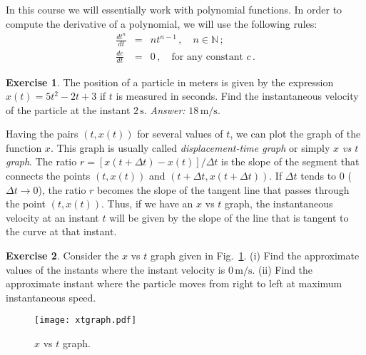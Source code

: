 \documentclass[12pt,a4paper]{article}
\newcommand{\N}{\mathbb{N}}
\theoremstyle{definition}
\newtheorem{ex}{Exercise}[section]
\begin{document}
In this course we will essentially work with polynomial functions. In
order to compute the derivative of a polynomial, we will use the
following rules:
\begin{eqnarray*}
  \frac{dt^n}{dt}&=&nt^{n-1}\,,\quad n\in\N\,;\\
  \frac{dc}{dt}&=& 0\,,\quad\mbox{for any constant }c\,.
\end{eqnarray*}

\begin{ex}
  The position of a particle in meters is given by the expression
  $x(t)=5 t^2-2 t+3$ if $t$ is measured in seconds. Find the
  instantaneous velocity of the particle at the instant
  $2\,\mathrm{s}$. \emph{Answer:} $18\,\mathrm{m/s}$.
\end{ex}

Having the pairs $(t,x(t))$ for several values of $t$, we can plot the
graph of the function $x$. This graph is usually called
\emph{displacement-time graph} or simply \emph{$x$ vs $t$ graph}. The
ratio $r=[x(t+\Delta t)-x(t)]/\Delta t$ is the slope of the segment
that connects the points $(t,x(t))$ and $(t+\Delta t,x(t+\Delta
t))$. If $\Delta t$ tends to $0$ ($\Delta t\to 0$), the ratio $r$
becomes the slope of the tangent line that passes through the point
$(t,x(t))$. Thus, if we have an $x$ vs $t$ graph, the instantaneous
velocity at an instant $t$ will be given by the slope of the line that
is tangent to the curve at that instant.

\begin{ex}
  Consider the $x$ vs $t$ graph given in Fig.~\ref{fig:xtgraph}. (i)
  Find the approximate values of the instants where the instant
  velocity is $0\,\mathrm{m/s}$. (ii) Find the approximate instant
  where the particle moves from right to left at maximum instantaneous
  speed.

  \begin{figure}[ht]
    \centering
    \texttt{[image: xtgraph.pdf]}
    \caption{$x$ vs $t$ graph.}
    \label{fig:xtgraph}
  \end{figure}
\end{ex}
\end{document}

